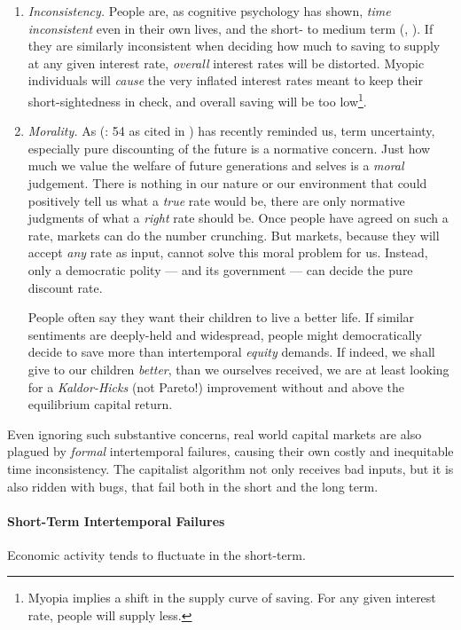 \begin{enumerate}
	\item \emph{Inconsistency.} People are, as cognitive psychology has shown, \emph{time inconsistent} even in their own lives, and the short- to medium term (\citealt{Ainslie1975}, \citealt{Thaler1981}). If they are similarly inconsistent  when deciding how much to saving to supply at any given interest rate, \emph{overall} interest rates will be distorted. Myopic individuals will \emph{cause} the very inflated interest rates meant to keep their short-sightedness in check, and overall saving will be too low\footnote{
		Myopia implies a shift in the supply curve of saving. For any given interest rate, people will supply less.}.
	\item \emph{Morality.} As \citeauthor{Samuelson2005} (\citeyear{Samuelson2005}: 54 as cited in \citealt{Stern-2006-aa}) has recently reminded us, term uncertainty, especially pure discounting of the future is a normative concern. Just how much we value the welfare of future generations and selves is a \emph{moral} judgement. There is nothing in our nature or our environment that could positively tell us what a \emph{true} rate would be, there are only normative judgments of what a \emph{right} rate should be. Once people have agreed on such a rate, markets can do the number crunching. But markets, because they will accept \emph{any} rate as input, cannot solve this moral problem for us. Instead, only a democratic polity --- and its government --- can decide the pure discount rate.
		
	People often say they want their children to live a better life. If similar sentiments are deeply-held and widespread, people might democratically decide to save more than intertemporal \emph{equity} demands. If indeed, we shall give to our children \emph{better}, than we ourselves received, we are at least looking for a \emph{Kaldor-Hicks} (not Pareto!) improvement without and above the equilibrium capital return.
	
\end{enumerate}

Even ignoring such substantive concerns, real world capital markets are also plagued by \emph{formal} intertemporal failures, causing their own costly and inequitable time inconsistency. The capitalist algorithm not only receives bad inputs, but it is also ridden with bugs, that fail both in the short and the long term.

\paragraph{Short-Term Intertemporal Failures} \label{sec:short-terminconsistency} Economic activity tends to fluctuate in the short-term. 


